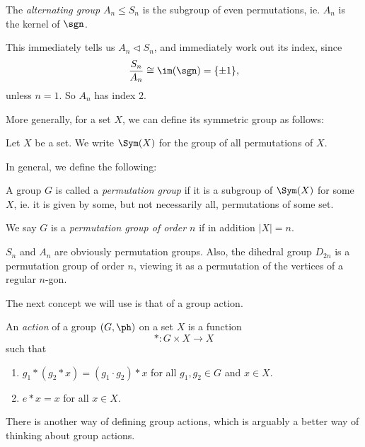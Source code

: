 \documentclass[a4paper]{article}
\begin{document}
\begin{defi}
  The \emph{alternating group} $A_n \leq S_n$ is the subgroup of even permutations, ie. $A_n$ is the kernel of $\sgn$.
\end{defi}

This immediately tells us $A_n \lhd S_n$, and immediately work out its index, since
\[
  \frac{S_n}{A_n} \cong \im (\sgn) = \{\pm 1\},
\]
unless $n = 1$. So $A_n$ has index $2$.

More generally, for a set $X$, we can define its symmetric group as follows:
\begin{defi}
  Let $X$ be a set. We write $\Sym(X)$ for the group of all permutations of $X$.
\end{defi}

In general, we define the following:
\begin{defi}
  A group $G$ is called a \emph{permutation group} if it is a subgroup of $\Sym(X)$ for some $X$, ie. it is given by some, but not necessarily all, permutations of some set.

  We say $G$ is a \emph{permutation group of order $n$} if in addition $|X| = n$.
\end{defi}

\begin{eg}
  $S_n$ and $A_n$ are obviously permutation groups. Also, the dihedral group $D_{2n}$ is a permutation group of order $n$, viewing it as a permutation of the vertices of a regular $n$-gon.
\end{eg}

The next concept we will use is that of a group action.
\begin{defi}
  An \emph{action} of a group $(G, \ph)$ on a set $X$ is a function
  \[
    *: G\times X \to X
  \]
  such that
  \begin{enumerate}
    \item $g_1 * (g_2 * x) = (g_1 \cdot g_2) * x$ for all $g_1, g_2 \in G$ and $x \in X$.
    \item $e * x = x$ for all $x \in X$.
  \end{enumerate}
\end{defi}
There is another way of defining group actions, which is arguably a better way of thinking about group actions.
\end{document}

